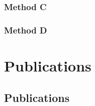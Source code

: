 \documentclass[%
paper=A4,					%
twoside=true,				%
openright,					%
parskip=full,				%
chapterprefix=true,			%
11pt,						%
headings=normal,			%
bibliography=totoc,			%
listof=totoc,				%
titlepage=on,				%
captions=tableabove,		%
draft=false,				%
]{scrreprt}%
\begin{document}
\subsection{Method C}

\newpage
\subsection{Method D}

\chapter{Publications}
\section{Publications}
\label{sec:label}

% 

\end{document}
